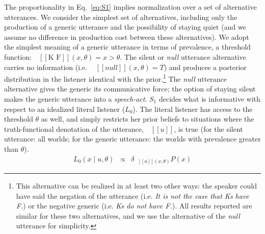 \documentclass[12pt,letterpaper]{article}
\newcommand{\denote}[1]{\mbox{ $[\![ #1 ]\!]$}}
\begin{document}
The proportionality in Eq.~\ref{eq:S1} implies normalization over a set of alternative utterances.
We consider the simplest set of alternatives, including only the production of a generic utterance and the possibility of staying quiet (and we assume no difference in production cost between these alternatives). 
We adopt the simplest meaning of a generic utterance in terms of prevalence, a threshold function: $\denote{\text{K F}}(x, \theta)=x>\theta$.
The silent or \emph{null} utterance alternative carries no information (i.e.~$\denote{null}(x, \theta)=T$) and produces a posterior distribution in the listener identical with the prior.\footnote{
This alternative can be realized in at least two other ways: the speaker could have said the negation of the utterance (i.e. \emph{It is not the case that Ks have F.}) or the negative generic (i.e. \emph{Ks do not have F.}). All results reported are similar for these two alternatives, and we use the alternative of the \emph{null} utterance for simplicity.
}
The \emph{null} utterance alternative gives the generic its communicative force; the option of staying silent makes the generic utterance into a \emph{speech-act}.
%
%
%
$S_1$ decides what is informative with respect to an idealized literal listener ($L_{0}$).
The literal listener has access to the threshold $\theta$ as well, and simply restricts her prior beliefs to situations where the truth-functional denotation of the utterance, $\denote{u}$, is true (for the silent utterance: all worlds; for the generic utterance: the worlds with prevalence greater than $\theta$).
%
\begin{eqnarray}
L_{0}(x \mid u, \theta) &\propto& {\delta_{\denote{u}(x, \theta)} P(x)} \label{eq:L0}
\end{eqnarray}
%
\end{document}
